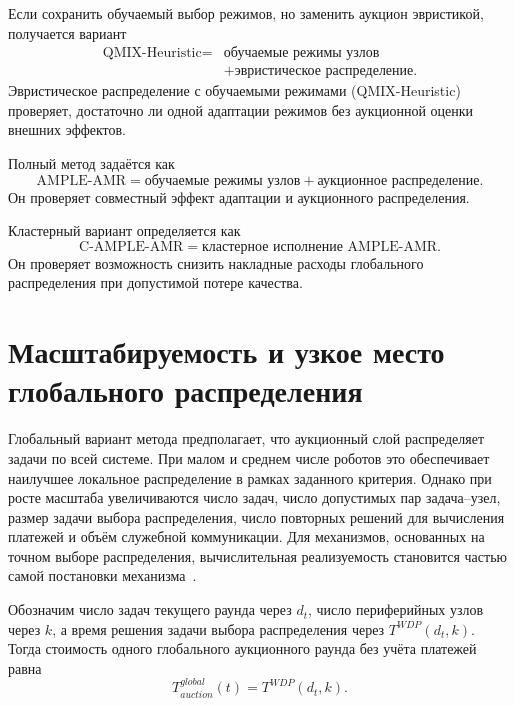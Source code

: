 Если сохранить обучаемый выбор режимов, но заменить аукцион эвристикой, получается вариант
\begin{equation}
    \begin{aligned}
    \text{QMIX-Heuristic} ={}& \text{обучаемые режимы узлов} \\
    &+ \text{эвристическое распределение}.
    \end{aligned}
    \label{eq:ch5_qmix_heuristic}
\end{equation}
Эвристическое распределение с обучаемыми режимами (QMIX-Heuristic) проверяет, достаточно ли одной адаптации режимов без аукционной оценки внешних эффектов.

Полный метод задаётся как
\begin{equation}
    \text{AMPLE-AMR} = \text{обучаемые режимы узлов} + \text{аукционное распределение}.
    \label{eq:ch5_full_method}
\end{equation}
Он проверяет совместный эффект адаптации и аукционного распределения.

Кластерный вариант определяется как
\begin{equation}
    \text{C-AMPLE-AMR} = \text{кластерное исполнение AMPLE-AMR}.
    \label{eq:ch5_clustered_method}
\end{equation}
Он проверяет возможность снизить накладные расходы глобального распределения при допустимой потере качества.

\section{Масштабируемость и узкое место глобального распределения}

Глобальный вариант метода предполагает, что аукционный слой распределяет задачи по всей системе. При малом и среднем числе роботов это обеспечивает наилучшее локальное распределение в рамках заданного критерия. Однако при росте масштаба увеличиваются число задач, число допустимых пар задача--узел, размер задачи выбора распределения, число повторных решений для вычисления платежей и объём служебной коммуникации. Для механизмов, основанных на точном выборе распределения, вычислительная реализуемость становится частью самой постановки механизма~\cite{NisanRonen2001AMD,NisanRonen2007VCG}.

Обозначим число задач текущего раунда через $d_t$, число периферийных узлов через $k$, а время решения задачи выбора распределения через $T^{WDP}(d_t,k)$. Тогда стоимость одного глобального аукционного раунда без учёта платежей равна
\begin{equation}
    T^{global}_{auction}(t)=T^{WDP}(d_t,k).
    \label{eq:ch5_global_auction_time}
\end{equation}

